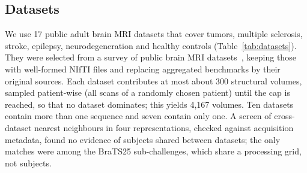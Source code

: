 \documentclass[11pt]{article}
\begin{document}
\subsection{Datasets}

We use 17 public adult brain MRI datasets that cover tumors, multiple
sclerosis, stroke, epilepsy, neurodegeneration and healthy controls
(Table~\ref{tab:datasets}). They were selected from a survey of public brain
MRI datasets~\cite{luu_structured_2025}, keeping those with well-formed NIfTI
files and replacing aggregated benchmarks by their original sources. Each
dataset contributes at most about 300 structural volumes, sampled
patient-wise (all scans of a randomly chosen patient) until the cap is
reached, so that no dataset dominates; this yields 4{,}167 volumes. Ten
datasets contain more than one sequence and seven contain only one. A
screen of cross-dataset nearest neighbours in four representations, checked
against acquisition metadata, found no evidence of subjects shared between
datasets; the only matches were among the BraTS25 sub-challenges, which share
a processing grid, not subjects.
\end{document}

